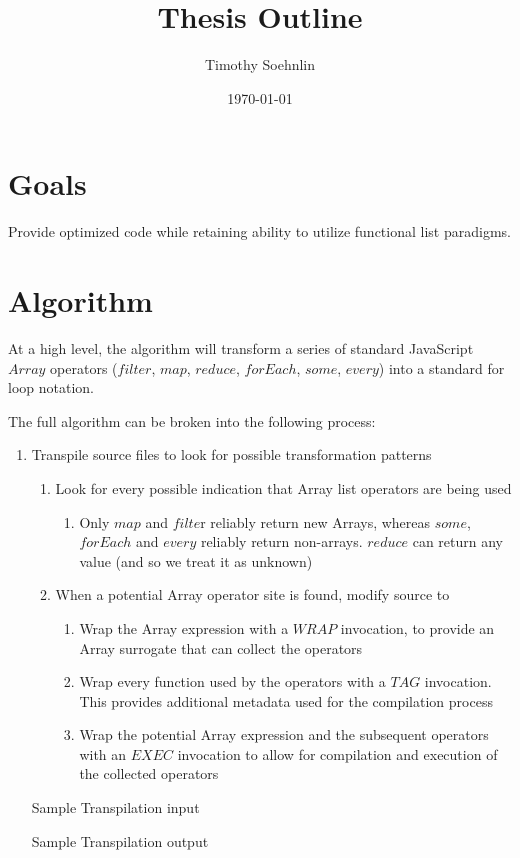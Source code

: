 \documentclass{article}
\title{Thesis Outline}
\author{Timothy Soehnlin}
\date{\today}
\begin{document}
\section{Goals}
Provide optimized code while retaining ability to utilize functional list paradigms.

\section{Algorithm}
At a high level, the algorithm will transform a series of standard JavaScript $Array$ operators ($filter$, $map$, 
$reduce$, $forEach$, $some$, $every$) into a standard for loop notation.  

The full algorithm can be broken into the following process:
\begin{enumerate}
  \item Transpile source files to look for possible transformation patterns
  \begin{enumerate}
    \item Look for every possible indication that Array list operators are being used
    \begin{enumerate}
      \item Only $map$ and $filte$r reliably return new Arrays, whereas $some$, 
        $forEach$ and $every$ reliably return non-arrays.  $reduce$ can return 
        any value (and so we treat it as unknown)    
    \end{enumerate}
    \item When a potential Array operator site is found, modify source to
    \begin{enumerate} 
      \item	Wrap the Array expression with a $WRAP$ invocation, to provide an Array surrogate that can collect the operators
      \item	Wrap every function used by the operators with a $TAG$ invocation.  This provides additional metadata used for the compilation process
      \item	Wrap the potential Array expression and the subsequent operators with an $EXEC$ invocation to allow for compilation and execution of the collected operators
    \end{enumerate}    
  \end{enumerate}

  Sample Transpilation input  
  

  Sample Transpilation output  
  


\end{enumerate}
\end{document}
